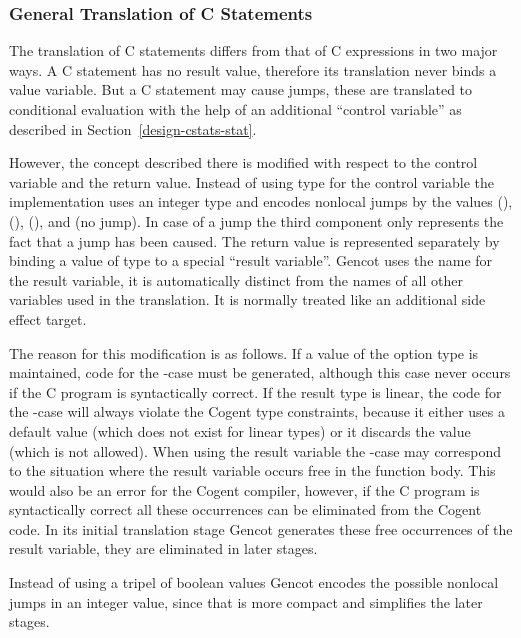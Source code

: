 \subsubsection{General Translation of C Statements}

The translation of C statements differs from that of C expressions in two major ways. A C statement has no result 
value, therefore its translation never binds a value variable. But a C statement may cause jumps, these are translated
to conditional evaluation with the help of an additional ``control variable''  as described in 
Section~\ref{design-cstats-stat}.

However, the concept described there is modified with respect to the control variable and the return value. Instead of using type  for the control variable the implementation uses an integer type and encodes nonlocal jumps by the 
values  (),  (),  (), and  (no jump). In case 
of a  jump the third component only represents the fact that a jump has been caused. The return value is represented 
separately by binding a value of type  to a special ``result variable''. Gencot uses the name  for the 
result variable, it is automatically distinct from the names of all other variables used in the translation. It is
normally treated like an additional side effect target.

The reason for this modification is as follows. If a value of the option type is maintained, code for the -case
must be generated, although this case never occurs if the C program is syntactically correct. If the result type  
is linear, the code for the -case will always violate the Cogent type constraints, because it either uses
a default value (which does not exist for linear types) or it discards the value (which is not allowed). When using the 
result variable the -case may correspond to the situation where the result variable occurs free in the function 
body. This would also be an error for the Cogent compiler, however, if the C program is syntactically correct all these
occurrences can be eliminated from the Cogent code. In its initial translation stage Gencot generates these free occurrences
of the result variable, they are eliminated in later stages.

Instead of using a tripel of boolean values Gencot encodes the possible nonlocal jumps in an integer value, since that is more
compact and simplifies the later stages.

